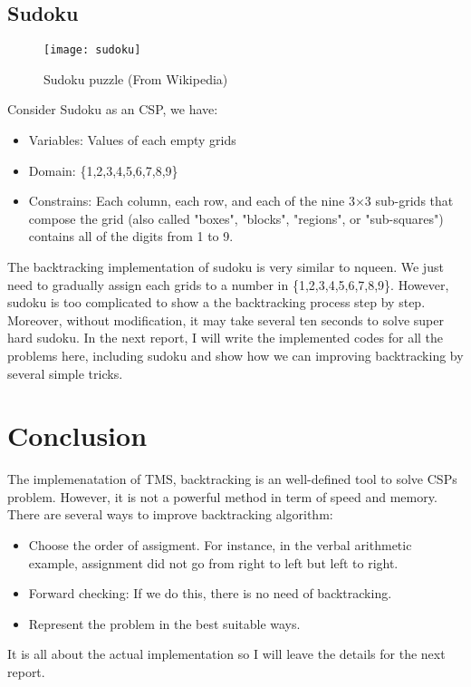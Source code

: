 \documentclass[a4paper, 11pt]{article}
\begin{document}
\subsection{Sudoku}
\begin{figure}[hbt]
  \centering
  \texttt{[image: sudoku]}
  \caption[Close up of \textit{Hemidactylus} sp.]
  {Sudoku puzzle (From Wikipedia)}
\end{figure}
Consider Sudoku as an CSP, we have:
\begin{itemize}
\item Variables: Values of each empty grids
\item Domain: \{1,2,3,4,5,6,7,8,9\}
\item Constrains: Each column, each row, and each of the nine 3×3 sub-grids that compose the grid (also called "boxes", "blocks", "regions", or "sub-squares") contains all of the digits from 1 to 9.
\end{itemize}
The backtracking implementation of sudoku is very similar to nqueen. We just need to gradually assign each grids to a number in \{1,2,3,4,5,6,7,8,9\}. However, sudoku is too complicated to show a the backtracking process step by step. Moreover, without modification, it may take several ten seconds to solve super hard sudoku. In the next report, I will write the implemented codes for all the problems here, including sudoku and show how we can improving backtracking by several simple tricks.

\section{Conclusion}
The implemenatation of TMS, backtracking is an well-defined tool to solve CSPs problem. However, it is not a powerful method in term of speed and memory. There are several ways to improve backtracking algorithm:
\begin{itemize}
\item Choose the order of assigment. For instance, in the verbal arithmetic example, assignment did not go from right to left but left to right.
\item Forward checking: If we do this, there is no need of backtracking. 
\item Represent the problem in the best suitable ways.
\end{itemize}
It is all about the actual implementation so I will leave the details for the next report.
\end{document}
